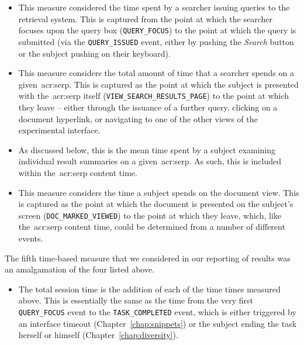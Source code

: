 \begin{itemize}
    \item{ This measure considered the time spent by a searcher issuing queries to the retrieval system. This is captured from the point at which the searcher focuses upon the query box (\texttt{QUERY\_FOCUS}) to the point at which the query is submitted (via the \texttt{QUERY\_ISSUED} event, either by pushing the \emph{Search} button or the subject pushing \Return on their keyboard).}
    \item{ This measure considers the total amount of time that a searcher spends on a given~\gls{acr:serp}. This is captured as the point at which the subject is presented with the~\gls{acr:serp} itself (\texttt{VIEW\_SEARCH\_RESULTS\_PAGE}) to the point at which they leave -- either through the issuance of a further query, clicking on a document hyperlink, or navigating to one of the other views of the experimental interface.}
    \item{ As discussed below, this is the mean time spent by a subject examining individual result summaries on a given~\gls{acr:serp}. As such, this is included within the~\gls{acr:serp} content time.}
    \item{ This measure considers the time a subject spends on the document view. This is captured as the point at which the document is presented on the subject's screen (\texttt{DOC\_MARKED\_VIEWED}) to the point at which they leave, which, like the~\gls{acr:serp} content time, could be determined from a number of different events.}
\end{itemize}

\vspace*{-3mm}
The fifth time-based measure that we considered in our reporting of results was an amalgamation of the four listed above.
\vspace*{-3mm}

\begin{itemize}
    \item{ The total session time is the addition of each of the time times measured above. This is essentially the same as the time from the very first \texttt{QUERY\_FOCUS} event to the \texttt{TASK\_COMPLETED} event, which is either triggered by an interface timeout (Chapter~\ref{chap:snippets}) or the subject ending the task herself or himself (Chapter~\ref{chap:diversity}).}
    
\end{itemize}


